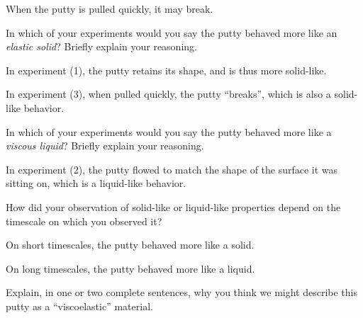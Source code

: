 \begin{activity}
\begin{model}
\begin{enumerate}
\begin{itemize}
\begin{solution}[1in]
					When the putty is pulled quickly, it may break.
					
				\end{solution}
			\end{itemize}
		
	\end{enumerate}

\end{model}


\begin{ctqs}

	\question In which of your experiments would you say the putty behaved more like an \emph{elastic solid}?  Briefly explain your reasoning.
	
		\begin{solution}[1.25in]
		
			In experiment (1), the putty retains its shape, and is thus more solid-like.
			
			In experiment (3), when pulled quickly, the putty ``breaks'', which is also a solid-like behavior.
		
		\end{solution}
	
	\question In which of your experiments would you say the putty behaved more like a \emph{viscous liquid}?  Briefly explain your reasoning.
	
		\begin{solution}[1in]
		
			In experiment (2), the putty flowed to match the shape of the surface it was sitting on, which is a liquid-like behavior.
		
		\end{solution}
	
	\question How did your observation of solid-like or liquid-like properties depend on the timescale on which you observed it?
	
		\begin{solution}[1in]
		
			On short timescales, the putty behaved more like a solid.
			
			On long timescales, the putty behaved more like a liquid.
			
		\end{solution}
		
	\question Explain, in one or two complete sentences, why you think we might describe this putty as a ``viscoelastic'' material.
	
			\begin{solution}[1.5in]
			

\end{solution}
\end{ctqs}
\end{activity}
